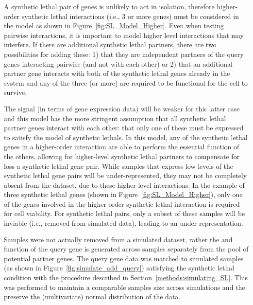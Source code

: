 A \gls{synthetic lethal} pair of genes is unlikely to act in isolation, therefore higher-order \gls{synthetic lethal} interactions (i.e., 3 or more genes) must be considered in the model as shown in Figure~\ref{fig:SL_Model_Higher}. Even when testing pairwise interactions, it is important to model higher level interactions that may interfere. If there are additional \gls{synthetic lethal} partners, there are two possibilities for adding these: 1) that they are independent partners of the query genes interacting pairwise (and not with each other) or 2) that an additional partner gene interacts with both of the \gls{synthetic lethal} genes already in the system and any of the three (or more) are required to be functional for the cell to survive.

The signal (in terms of \gls{gene expression} data) will be weaker for this latter case and this model has the more stringent assumption that all \gls{synthetic lethal} partner genes interact with each other: that only one of these must be expressed to satisfy the model of \glspl{synthetic lethal}. In this model, any of the \gls{synthetic lethal} genes in a higher-order interaction are able to perform the essential function of the others, allowing for higher-level \gls{synthetic lethal} partners to compensate for loss a \gls{synthetic lethal} gene pair. While samples that express low levels of the \gls{synthetic lethal} gene pairs will be under-represented, they may not be completely absent from the dataset, due to these higher-level interactions. In the example of three \gls{synthetic lethal} genes (shown in Figure~\ref{fig:SL_Model_Higher}), only one of the genes involved in the higher-order \gls{synthetic lethal} interaction is required for cell viability. For \gls{synthetic lethal} pairs, only a subset of these samples will be inviable (i.e., removed from simulated data), leading to an under-representation.

Samples were not actually removed from a simulated dataset, rather the  and function of the query gene is generated across samples separately from the pool of potential partner genes. The query gene data was matched to simulated samples (as shown in Figure~\ref{fig:simulate_add_query}) satisfying the \gls{synthetic lethal} condition with the procedure described in Section~\ref{methods:simulating_SL}. This was performed to maintain a comparable samples size across simulations and the preserve the (multivariate) normal distribution of the data. 

\FloatBarrier

